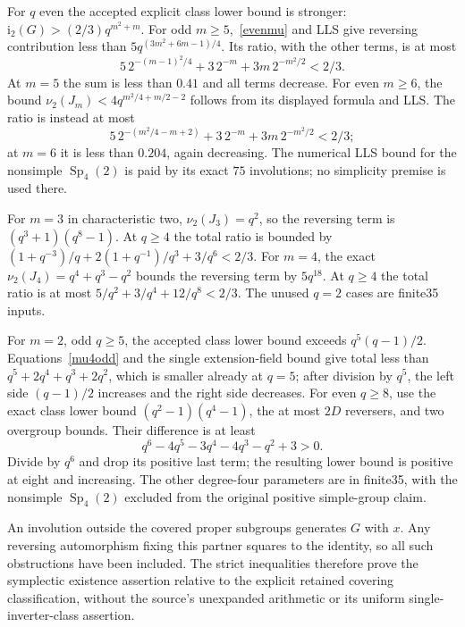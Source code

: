 \documentclass[10pt]{article}
\newcommand{\ii}{\mathrm i_2}\newcommand{\nuu}{\nu_2}\newcommand{\F}{\mathbb F}\newcommand{\GL}{\operatorname{GL}}\newcommand{\GU}{\operatorname{GU}}\newcommand{\Sp}{\operatorname{Sp}}\newcommand{\PSp}{\operatorname{PSp}}\newcommand{\PGSp}{\operatorname{PGSp}}\newcommand{\Aut}{\operatorname{Aut}}
\begin{document}
For $q$ even the accepted explicit class lower bound is stronger:
$\ii(G)>(2/3)q^{m^2+m}$. For odd $m\ge5$,~\eqref{evenmu} and LLS give
reversing contribution less than $5q^{(3m^2+6m-1)/4}$. Its ratio, with the
other terms, is at most
\[
 5\,2^{-(m-1)^2/4}+3\,2^{-m}+3m\,2^{-m^2/2}<2/3.
\]
At $m=5$ the sum is less than $0.41$ and all terms decrease. For even
$m\ge6$, the bound $\nuu(J_m)<4q^{m^2/4+m/2-2}$ follows from its displayed
formula and LLS. The ratio is instead at most
\[
 5\,2^{-(m^2/4-m+2)}+3\,2^{-m}+3m\,2^{-m^2/2}<2/3;
\]
at $m=6$ it is less than $0.204$, again decreasing. The numerical LLS
bound for the nonsimple $\Sp_4(2)$ is paid by its exact $75$ involutions;
no simplicity premise is used there.

For $m=3$ in characteristic two, $\nuu(J_3)=q^2$, so the reversing term
is $(q^3+1)(q^8-1)$. At $q\ge4$ the total ratio is bounded by
$(1+q^{-3})/q+2(1+q^{-1})/q^3+3/q^6<2/3$.
For $m=4$, the exact $\nuu(J_4)=q^4+q^3-q^2$ bounds the reversing term
by $5q^{18}$. At $q\ge4$ the total ratio is at most
$5/q^2+3/q^4+12/q^8<2/3$. The unused $q=2$ cases are finite35 inputs.

For $m=2$, odd $q\ge5$, the accepted class lower bound exceeds
$q^5(q-1)/2$. Equations~\eqref{mu4odd} and the single extension-field
bound give total less than
$q^5+2q^4+q^3+2q^2$, which is smaller already at $q=5$; after division by
$q^5$, the left side $(q-1)/2$ increases and the right side decreases.
For even $q\ge8$, use the exact class lower bound
$(q^2-1)(q^4-1)$, the at most $2D$ reversers, and two overgroup bounds.
Their difference is at least
\[
 q^6-4q^5-3q^4-4q^3-q^2+3>0.
\]
Divide by $q^6$ and drop its positive last term; the resulting lower bound
is positive at eight and increasing. The other degree-four parameters are
in finite35, with the nonsimple $\Sp_4(2)$ excluded from the original
positive simple-group claim.

An involution outside the covered proper subgroups generates $G$ with $x$.
Any reversing automorphism fixing this partner squares to the identity,
so all such obstructions have been included. The strict inequalities
therefore prove the symplectic existence assertion relative to the
explicit retained covering classification, without the source's unexpanded arithmetic
or its uniform single-inverter-class assertion.
\end{document}
